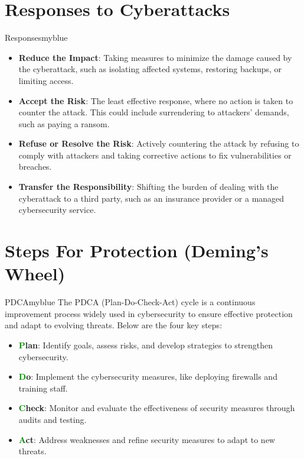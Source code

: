 \section{Responses to Cyberattacks}
\begin{prettyBox}{Responses}{myblue}
\begin{itemize}
    \item \textbf{Reduce the Impact}: Taking measures to minimize the damage caused by the cyberattack, such as isolating affected systems, restoring backups, or limiting access.  
    \item \textbf{Accept the Risk}: The least effective response, where no action is taken to counter the attack. This could include surrendering to attackers’ demands, such as paying a ransom.  
    \item \textbf{Refuse or Resolve the Risk}: Actively countering the attack by refusing to comply with attackers and taking corrective actions to fix vulnerabilities or breaches.  
    \item \textbf{Transfer the Responsibility}: Shifting the burden of dealing with the cyberattack to a third party, such as an insurance provider or a managed cybersecurity service.  
\end{itemize}
\end{prettyBox}

\vspace{0.5cm}

\section{Steps For Protection (Deming's Wheel)}
\begin{prettyBox}{PDCA}{myblue}
    The PDCA (Plan-Do-Check-Act) cycle is a continuous improvement process widely used in
cybersecurity to ensure effective protection and adapt to evolving threats. Below are the four key steps:

    \begin{itemize}
        \item \textbf{\textcolor{green}{P}lan}: Identify goals, assess risks, and develop strategies to strengthen cybersecurity.
        \item \textbf{\textcolor{green}{D}o}: Implement the cybersecurity measures, like deploying firewalls and training staff.
        \item \textbf{\textcolor{green}{C}heck}: Monitor and evaluate the effectiveness of security measures through audits and testing.
        \item \textbf{\textcolor{green}{A}ct}: Address weaknesses and refine security measures to adapt to new threats.
    \end{itemize}
\end{prettyBox}

